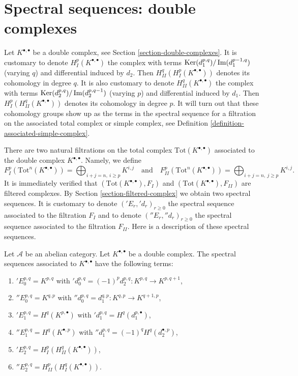 \section{Spectral sequences: double complexes}
\label{section-double-complex}

\noindent
Let $K^{\bullet, \bullet}$ be a double complex, see
Section \ref{section-double-complexes}. It is customary to denote
$H^p_I(K^{\bullet, \bullet})$
the complex with terms $\mathop{\mathrm{Ker}}(d_1^{p, q})/\mathop{\mathrm{Im}}(d_1^{p - 1, q})$
(varying $q$) and differential induced by $d_2$.
Then $H^q_{II}(H^p_I(K^{\bullet, \bullet}))$ denotes its cohomology in
degree $q$. It is also customary to denote $H^q_{II}(K^{\bullet, \bullet})$
the complex with terms $\mathop{\mathrm{Ker}}(d_2^{p, q})/\mathop{\mathrm{Im}}(d_2^{p, q - 1})$
(varying $p$) and differential induced by $d_1$.
Then $H^p_I(H^q_{II}(K^{\bullet, \bullet}))$ denotes its cohomology in
degree $p$. It will turn out that these cohomology groups show up
as the terms in the spectral sequence for a filtration on the
associated total complex or simple complex, see
Definition \ref{definition-associated-simple-complex}.

\medskip\noindent
There are two natural filtrations on the total complex
$\text{Tot}(K^{\bullet, \bullet})$
associated to the double complex $K^{\bullet, \bullet}$. Namely, we
define
$$
F_I^p(\text{Tot}^n(K^{\bullet, \bullet})) =
\bigoplus\nolimits_{i + j = n, \ i \geq p} K^{i, j}
\quad
\text{and}
\quad
F_{II}^p(\text{Tot}^n(K^{\bullet, \bullet})) =
\bigoplus\nolimits_{i + j = n, \ j \geq p} K^{i, j}.
$$
It is immediately verified that $(\text{Tot}(K^{\bullet, \bullet}), F_I)$ and
$(\text{Tot}(K^{\bullet, \bullet}), F_{II})$ are filtered complexes.
By Section \ref{section-filtered-complex}
we obtain two spectral sequences. It is customary to
denote $({}'E_r, {}'d_r)_{r \geq 0}$ the spectral sequence associated
to the filtration $F_I$ and to denote $({}''E_r, {}''d_r)_{r \geq 0}$
the spectral sequence associated to the filtration $F_{II}$.
Here is a description of these spectral sequences.

\begin{lemma}
\label{lemma-ss-double-complex}
Let $\mathcal{A}$ be an abelian category.
Let $K^{\bullet, \bullet}$ be a double complex.
The spectral sequences associated to $K^{\bullet, \bullet}$
have the following terms:
\begin{enumerate}
\item ${}'E_0^{p, q} = K^{p, q}$ with
${}'d_0^{p, q} = (-1)^p d_2^{p, q} : K^{p, q} \to K^{p, q + 1}$,
\item ${}''E_0^{p, q} = K^{q, p}$ with
${}''d_0^{p, q} = d_1^{q, p} : K^{q, p} \to K^{q + 1, p}$,
\item ${}'E_1^{p, q} = H^q(K^{p, \bullet})$ with
${}'d_1^{p, q} = H^q(d_1^{p, \bullet})$,
\item ${}''E_1^{p, q} = H^q(K^{\bullet, p})$ with
${}''d_1^{p, q} = (-1)^q H^q(d_2^{\bullet, p})$,
\item ${}'E_2^{p, q} = H^p_I(H^q_{II}(K^{\bullet, \bullet}))$,
\item ${}''E_2^{p, q} = H^p_{II}(H^q_I(K^{\bullet, \bullet}))$.
\end{enumerate}
\end{lemma}

